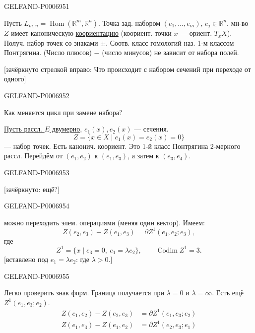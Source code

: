\begin{GelfandAdjacentEvidence}{GELFAND-P000695}{1}

Пусть \(L_{m,n}=\operatorname{Hom}(\mathbb R^m,\mathbb R^n)\).
Точка зад. набором \((e_1,\ldots,e_m)\), \(e_j\in\mathbb R^n\).
мн-во \(Z\) имеет каноническую \underline{коориентацию}
(коориент. точки \(x\) --- ориент. \(T_xX\)).
Получ. набор точек со знаками \(\pm\).
Соотв. класс гомологий наз. 1-м классом Понтрягина.
(Число плюсов) \(-\) (число минусов) не зависит от набора полей.

[зачёркнуто стрелкой вправо: Что происходит с набором сечений при переходе от одного]
\end{GelfandAdjacentEvidence}
\begin{GelfandAdjacentEvidence}{GELFAND-P000695}{2}


Как меняется цикл при замене набора?

\underline{Пусть рассл. \(E\) двумерно}, \(e_1(x),e_2(x)\) --- сечения.
\[
Z=\{x\in X\mid e_1(x)=e_2(x)=0\}
\]
--- набор точек. Есть канонич. коориент.
Это 1-й класс Понтрягина 2-мерного рассл.
Перейдём от \((e_1,e_2)\) к \((e_1,e_3)\), а затем к \((e_3,e_4)\).
\end{GelfandAdjacentEvidence}
\begin{GelfandAdjacentEvidence}{GELFAND-P000695}{3}


[зачёркнуто: ещё?]
\end{GelfandAdjacentEvidence}
\begin{GelfandAdjacentEvidence}{GELFAND-P000695}{4}

можно переходить элем. операциями (меняя один вектор).
Имеем:
\begin{equation}
Z(e_2,e_3)-Z(e_1,e_3)=\partial Z^1(e_1,e_2;e_3),\tag{1}
\end{equation}
где
\[
Z^1=\{x\mid e_3=0,\ e_1=\lambda e_2\},\qquad\operatorname{Codim}Z^1=3.
\]
[вставлено под \(e_1=\lambda e_2\): где \(\lambda>0\).]
\end{GelfandAdjacentEvidence}
\begin{GelfandAdjacentEvidence}{GELFAND-P000695}{5}

Легко проверить знак форм. Граница получается при \(\lambda=0\) и \(\lambda=\infty\).
Есть ещё \(Z^1(e_1,e_3;e_2)\).
\begin{align}
Z(e_1,e_2)-Z(e_2,e_3)&=\partial Z^1(e_1,e_3;e_2)\tag{2}\\
Z(e_1,e_3)-Z(e_1,e_2)&=\partial Z^1(e_2,e_3;e_1)\tag{3}
\end{align}
\end{GelfandAdjacentEvidence}
